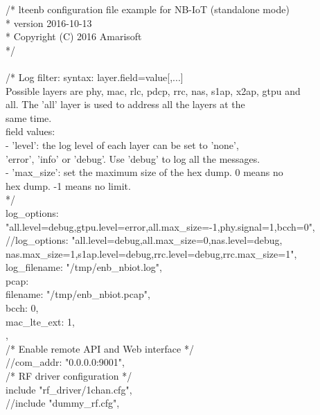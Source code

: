 /* lteenb configuration file example for NB-IoT (standalone mode)\\
 * version 2016-10-13\\
 * Copyright (C) 2016 Amarisoft\\
 */\\
{\\
  /* Log filter: syntax: layer.field=value[,...]\\
  
     Possible layers are phy, mac, rlc, pdcp, rrc, nas, s1ap, x2ap, gtpu and\\
     all. The 'all' layer is used to address all the layers at the\\
     same time.\\

     field values:\\

     - 'level': the log level of each layer can be set to 'none',\\
     'error', 'info' or 'debug'. Use 'debug' to log all the messages.\\
     
     - 'max\_size': set the maximum size of the hex dump. 0 means no\\
       hex dump. -1 means no limit.\\
  */\\
  log\_options: "all.level=debug,gtpu.level=error,all.max\_size=-1,phy.signal=1,bcch=0",\\
  //log\_options: "all.level=debug,all.max\_size=0,nas.level=debug, \\ nas.max\_size=1,s1ap.level=debug,rrc.level=debug,rrc.max\_size=1",\\
  log\_filename: "/tmp/enb\_nbiot.log",\\
  pcap: {\\
   filename: "/tmp/enb\_nbiot.pcap",\\
   bcch: 0,\\
   mac\_lte\_ext: 1,\\
  },\\
 
  /* Enable remote API and Web interface */\\
  //com\_addr: "0.0.0.0:9001",\\

  /* RF driver configuration */\\
  include "rf\_driver/1chan.cfg",\\
  //include "dummy\_rf.cfg",\\

}
